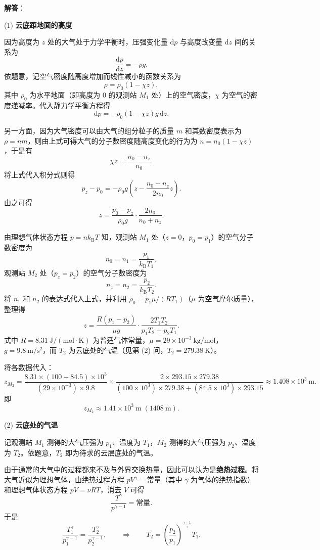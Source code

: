 \documentclass[UTF8]{ctexart}
\begin{document}
\textbf{解答}：

(1) \textbf{云底距地面的高度}

因为高度为 $z$ 处的大气处于力学平衡时，压强变化量 $\mathrm{d}p$ 与高度改变量 $\mathrm{d}z$ 间的关系为
\[
\frac{\mathrm{d}p}{\mathrm{d}z}=-\rho g .
\]
依题意，记空气密度随高度增加而线性减小的函数关系为
\[
\rho=\rho_0(1-\chi z),
\]
其中 $\rho_0$ 为水平地面（即高度为 $0$ 的观测站 $M_1$ 处）上的空气密度，$\chi$ 为空气的密度递减率。代入静力学平衡方程得
\[
\mathrm{d}p=-\rho_0(1-\chi z)g\,\mathrm{d}z.
\]

另一方面，因为大气密度可以由大气的组分粒子的质量 $m$ 和其数密度表示为 $\rho=nm$，则由上式可得大气的分子数密度随高度变化的行为为 $n=n_0(1-\chi z)$，于是有
\[
\chi z=\frac{n_0-n_z}{n_0}.
\]
将上式代入积分式则得
\[
p_z-p_0=-\rho_0 g\!\left(z-\frac{n_0-n_z}{2n_0}z\right).
\]
由之可得
\[
z=\frac{p_0-p_z}{\rho_0 g}\cdot\frac{2n_0}{n_0+n_z}.
\]

由理想气体状态方程 $p=nk_{\mathrm{B}}T$ 知，观测站 $M_1$ 处（$z=0$，$p_0=p_1$）的空气分子数密度为
\[
n_0=n_1=\frac{p_1}{k_{\mathrm{B}}T_1},
\]
观测站 $M_2$ 处（$p_z=p_2$）的空气分子数密度为
\[
n_z=n_2=\frac{p_2}{k_{\mathrm{B}}T_2}.
\]
将 $n_1$ 和 $n_2$ 的表达式代入上式，并利用 $\rho_0=p_1\mu/(RT_1)$（$\mu$ 为空气摩尔质量），整理得
\[
z=\frac{R(p_1-p_2)}{\mu g}\cdot\frac{2T_1T_2}{p_1T_2+p_2T_1}.
\]
式中 $R=8.31\ \mathrm{J/(mol\cdot K)}$ 为普适气体常量，$\mu=29\times 10^{-3}\ \mathrm{kg/mol}$，$g=9.8\ \mathrm{m/s^2}$，而 $T_2$ 为云底处的气温（见第 (2) 问，$T_2=279.38\ \mathrm{K}$）。

将各数据代入：
\[
z_{M_2}=\frac{8.31\times(100-84.5)\times 10^3}{(29\times 10^{-3})\times 9.8}
\times\frac{2\times 293.15\times 279.38}{(100\times 10^3)\times 279.38+(84.5\times 10^3)\times 293.15}
\approx 1.408\times 10^{3}\ \mathrm{m}.
\]
即
\[
\boxed{z_{M_2}\approx 1.41\times 10^{3}\ \mathrm{m}\;(1408\ \mathrm{m})}.
\]

(2) \textbf{云底处的气温}

记观测站 $M_1$ 测得的大气压强为 $p_1$、温度为 $T_1$，$M_2$ 测得的大气压强为 $p_2$、温度为 $T_2$。依题意，$T_2$ 即为待求的云层底处的气温。

由于通常的大气中的过程都来不及与外界交换热量，因此可以认为是\textbf{绝热过程}。将大气近似为理想气体，由绝热过程方程 $pV^{\gamma}=\text{常量}$（其中 $\gamma$ 为气体的绝热指数）和理想气体状态方程 $pV=\nu RT$，消去 $V$ 可得
\[
\frac{T^{\gamma}}{p^{\gamma-1}}=\text{常量}.
\]
于是
\[
\frac{T_1^{\gamma}}{p_1^{\gamma-1}}=\frac{T_2^{\gamma}}{p_2^{\gamma-1}},
\qquad\Longrightarrow\qquad
T_2=\left(\frac{p_2}{p_1}\right)^{\frac{\gamma-1}{\gamma}}T_1.
\]
\end{document}
